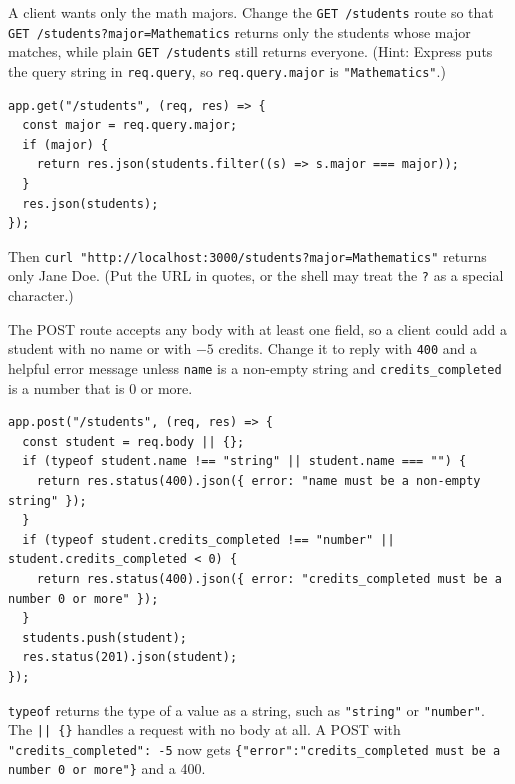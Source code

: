\begin{Exercise}[title={Filtering by Major}, label=webapi_filter]
A client wants only the math majors. Change the \verb|GET /students| route so that
\verb|GET /students?major=Mathematics| returns only the students whose major matches, while plain
\verb|GET /students| still returns everyone. (Hint: Express puts the query string in \verb|req.query|, so
\verb|req.query.major| is \verb|"Mathematics"|.)
\end{Exercise}
\begin{Answer}[ref=webapi_filter]
\begin{verbatim}
app.get("/students", (req, res) => {
  const major = req.query.major;
  if (major) {
    return res.json(students.filter((s) => s.major === major));
  }
  res.json(students);
});
\end{verbatim}
Then \verb|curl "http://localhost:3000/students?major=Mathematics"| returns only Jane Doe. (Put the URL in quotes,
or the shell may treat the \verb|?| as a special character.)
\end{Answer}

\begin{Exercise}[title={Better Validation}, label=webapi_validate]
The POST route accepts any body with at least one field, so a client could add a student with no name or with
$-5$ credits. Change it to reply with \verb|400| and a helpful error message unless \verb|name| is a non-empty
string and \verb|credits_completed| is a number that is 0 or more.
\end{Exercise}
\begin{Answer}[ref=webapi_validate]
\begin{verbatim}
app.post("/students", (req, res) => {
  const student = req.body || {};
  if (typeof student.name !== "string" || student.name === "") {
    return res.status(400).json({ error: "name must be a non-empty string" });
  }
  if (typeof student.credits_completed !== "number" || student.credits_completed < 0) {
    return res.status(400).json({ error: "credits_completed must be a number 0 or more" });
  }
  students.push(student);
  res.status(201).json(student);
});
\end{verbatim}
\verb|typeof| returns the type of a value as a string, such as \verb|"string"| or \verb|"number"|. The
\verb+|| {}+ handles a request with no body at all. A POST with \verb|"credits_completed": -5| now gets
\verb|{"error":"credits_completed must be a number 0 or more"}| and a 400.
\end{Answer}


